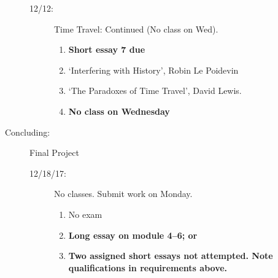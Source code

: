 \documentclass[article,oneside]{memoir}
\begin{document}
\begin{description}
\begin{description}
\begin{enumerate}
\end{enumerate}
\item[12/12:] Time Travel: Continued (No class on Wed).
\begin{enumerate}
\item \textbf{Short essay 7 due}
\item `Interfering with History', Robin Le Poidevin 
\item `The Paradoxes of Time Travel', David Lewis.
\item \textbf{No class on Wednesday}

\end{enumerate}
\end{description}

\item[Concluding:] Final Project
\begin{description}
\item[12/18/17:] No classes. Submit work on Monday.
\begin{enumerate}
\item No exam
\item \textbf{Long essay on module 4--6; or} 
\item \textbf{Two assigned short essays not attempted. Note qualifications in requirements above.}

\end{enumerate}
\end{description}
\end{description} 



\end{document}

